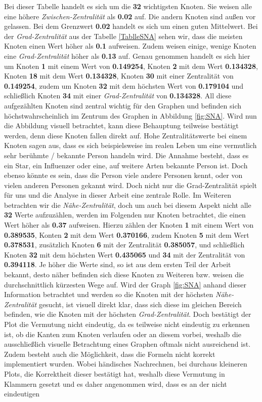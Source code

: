 \FloatBarrier
Bei dieser Tabelle handelt es sich um die \textbf{32} wichtigsten Knoten. Sie weisen alle eine höhere \textit{Zwischen-Zentralität} als \textbf{0.02} auf. Die andern Knoten sind außen vor gelassen. Bei dem Grenzwert \textbf{0.02} handelt es sich um einen guten Mittelwert.
Bei der \textit{Grad-Zentralität} aus der Tabelle \ref{TablleSNA} sehen wir, dass die meisten Knoten einen Wert höher als \textbf{0.1} aufweisen. Zudem weisen einige, wenige Knoten eine \textit{Grad-Zentralität} höher als \textbf{0.13} auf. Genau genommen handelt es sich hier um Knoten \textbf{1} mit einem Wert von \textbf{0.149254}, Knoten \textbf{2} mit dem Wert \textbf{0.134328}, Knoten \textbf{18} mit dem Wert \textbf{0.134328}, Knoten \textbf{30} mit einer Zentralität von \textbf{0.149254}, zudem um Knoten \textbf{32} mit dem höchsten Wert von \textbf{0.179104} und schließlich Knoten \textbf{34} mit einer \textit{Grad-Zentralität} von \textbf{0.134328}. All diese aufgezählten Knoten sind zentral wichtig für den Graphen und befinden sich höchstwahrscheinlich im Zentrum des Graphen in Abbildung \ref{fig:SNA}. Wird nun die Abbildung visuell betrachtet, kann diese Behauptung teilweise bestätigt werden, denn diese Knoten fallen direkt auf. Hohe Zentralitätswerte bei einem Knoten sagen aus, dass es sich beispielsweise im realen Leben um eine vermutlich sehr berühmte / bekannte Person handeln wird. Die Annahme besteht, dass es ein Star, ein Influenzer oder eine, auf weitere Arten bekannte Person ist. Doch ebenso könnte es sein, dass die Person viele andere Personen kennt, oder von vielen anderen Personen gekannt wird. Doch nicht nur die Grad-Zentralität spielt für uns und die Analyse in dieser Arbeit eine zentrale Rolle. Im Weiteren betrachten wir die \textit{Nähe-Zentralität}, doch um auch bei diesem Aspekt nicht alle \textbf{32} Werte aufzuzählen, werden im Folgenden nur Knoten betrachtet, die einen Wert höher als \textbf{0.37} aufweisen. Hierzu zählen der Knoten \textbf{1} mit einem Wert von \textbf{0.389535}, Konten \textbf{2} mit dem Wert \textbf{0.370166}, zudem Knoten \textbf{5} mit dem Wert \textbf{0.378531}, zusätzlich Knoten \textbf{6} mit der Zentralität \textbf{0.385057}, und schließlich Knoten \textbf{32} mit dem höchsten Wert \textbf{0.435065} und \textbf{34} mit der Zentralität von \textbf{0.394118}. Je höher die Werte sind, so ist aus dem ersten Teil der Arbeit bekannt, desto näher befinden sich diese Knoten zu Weiteren bzw. weisen die durchschnittlich kürzesten Wege auf. Wird der Graph \ref{fig:SNA} anhand dieser Information betrachtet und werden so die Knoten mit der höchsten \textit{Nähe-Zentralität} gesucht, ist visuell direkt klar, dass sich diese im gleichen Bereich befinden, wie die Knoten mit der höchsten \textit{Grad-Zentralität}. Doch bestätigt der Plot die Vermutung nicht eindeutig, da es teilweise nicht eindeutig zu erkennen ist, ob die Kanten zum Knoten verlaufen oder an diesem vorbei, weshalb die ausschließlich visuelle Betrachtung eines Graphen oftmals nicht ausreichend ist. Zudem besteht auch die Möglichkeit, dass die Formeln nicht korrekt implementiert wurden. Wobei händisches Nachrechnen, bei durchaus kleineren Plots, die Korrektheit dieser bestätigt hat, weshalb diese Vermutung in Klammern gesetzt und es daher angenommen wird, dass es an der nicht eindeutigen 